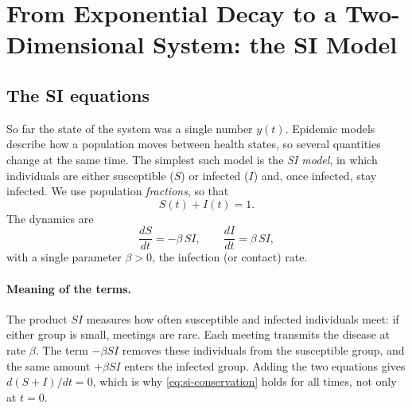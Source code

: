 \documentclass[11pt,a4paper]{article}
\begin{document}
\section{From Exponential Decay to a Two-Dimensional System: the SI Model}
\label{sec:si}
\subsection{The SI equations}

So far the state of the system was a single number $y(t)$. Epidemic models
describe how a population moves between health states, so several quantities
change at the same time. The simplest such model is the \emph{SI model}, in which
individuals are either susceptible ($S$) or infected ($I$) and, once infected,
stay infected. We use population \emph{fractions}, so that
\begin{equation}
  S(t) + I(t) = 1 .
  \label{eq:si-conservation}
\end{equation}
The dynamics are
\begin{equation}
  \frac{dS}{dt} = -\beta\, S I, \qquad \frac{dI}{dt} = \beta\, S I,
  \label{eq:si}
\end{equation}
with a single parameter $\beta>0$, the infection (or contact) rate.

\paragraph{Meaning of the terms.}
The product $SI$ measures how often susceptible and infected individuals meet:
if either group is small, meetings are rare. Each meeting transmits the disease
at rate $\beta$. The term $-\beta SI$ removes these individuals from the
susceptible group, and the same amount $+\beta SI$ enters the infected group.
Adding the two equations gives $d(S+I)/dt = 0$, which is why
\eqref{eq:si-conservation} holds for all times, not only at $t=0$.
\end{document}

